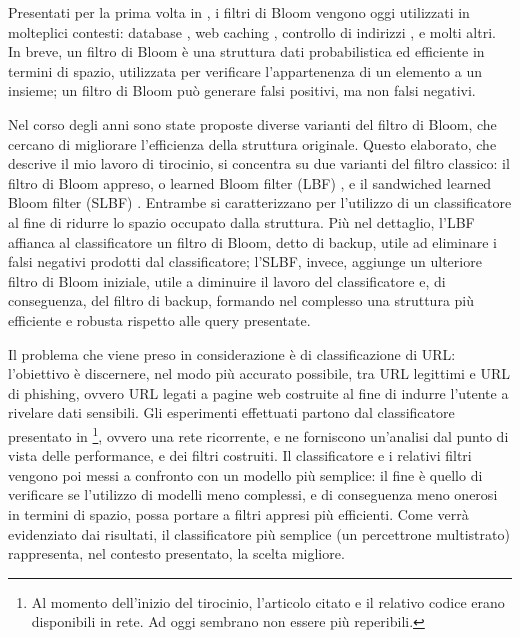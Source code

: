 \documentclass[../../main.tex]{subfiles}
\begin{document}
    
    Presentati per la prima volta in \cite{Bloom1970SpacetimeTI}, i filtri di Bloom vengono oggi utilizzati in molteplici contesti: database \cite{kraska2018case}, web caching \cite{Maggs15algorithmicnuggets}, controllo di indirizzi \cite{Dharmapurikar2006LongestPM}, e molti altri. In breve, un filtro di Bloom è una struttura dati probabilistica ed efficiente in termini di spazio, utilizzata per verificare l'appartenenza di un elemento a un insieme; un filtro di Bloom può generare falsi positivi, ma non falsi negativi.

    Nel corso degli anni sono state proposte diverse varianti del filtro di Bloom, che cercano di migliorare l'efficienza della struttura originale. Questo elaborato, che descrive il mio lavoro di tirocinio, si concentra su due varianti del filtro classico: il filtro di Bloom appreso, o learned Bloom filter (LBF) \cite{kraska2018case}, e il sandwiched learned Bloom filter (SLBF) \cite{10.5555/3326943.3326986}. Entrambe si caratterizzano per l'utilizzo di un classificatore al fine di ridurre lo spazio occupato dalla struttura. Più nel dettaglio, l'LBF affianca al classificatore un filtro di Bloom, detto di backup, utile ad eliminare i falsi negativi prodotti dal classificatore; l'SLBF, invece, aggiunge un ulteriore filtro di Bloom iniziale, utile a diminuire il lavoro del classificatore e, di conseguenza, del filtro di backup, formando nel complesso una struttura più efficiente e robusta rispetto alle query presentate.

    Il problema che viene preso in considerazione è di classificazione di URL: l'obiettivo è discernere, nel modo più accurato possibile, tra URL legittimi e URL di phishing, ovvero URL legati a pagine web costruite al fine di indurre l'utente a rivelare dati sensibili. Gli esperimenti effettuati partono dal classificatore presentato in \cite{ma2020}\footnote{Al momento dell'inizio del tirocinio, l'articolo citato e il relativo codice erano disponibili in rete. Ad oggi sembrano non essere più reperibili.}, ovvero una rete ricorrente, e ne forniscono un'analisi dal punto di vista delle performance, e dei filtri costruiti. Il classificatore e i relativi filtri vengono poi messi a confronto con un modello più semplice: il fine è quello di verificare se l'utilizzo di modelli meno complessi, e di conseguenza meno onerosi in termini di spazio, possa portare a filtri appresi più efficienti. Come verrà evidenziato dai risultati, il classificatore più semplice (un percettrone multistrato) rappresenta, nel contesto presentato, la scelta migliore.
\end{document}
